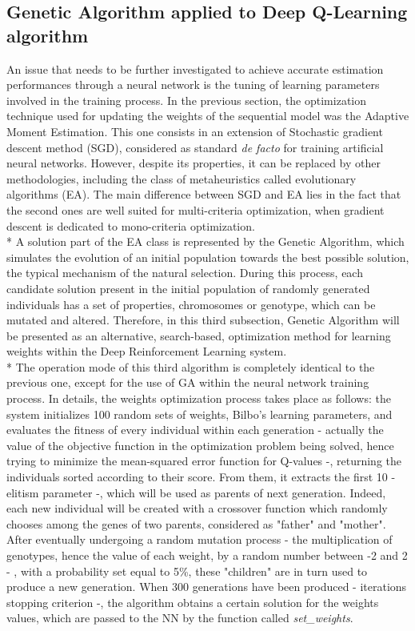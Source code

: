 \subsection{Genetic Algorithm applied to Deep Q-Learning algorithm}
An issue that needs to be further investigated to achieve accurate estimation performances through a neural network is the tuning of learning parameters involved in the training process. In the previous section, the optimization technique used for updating the weights of the sequential model was the Adaptive Moment Estimation. This one consists in an extension of Stochastic gradient descent method (SGD), considered as standard \textit{de facto} for training artificial neural networks. However, despite its properties, it can be replaced by other methodologies, including the class of metaheuristics called evolutionary algorithms (EA). The main difference between SGD and EA lies in the fact that the second ones are well suited for multi-criteria optimization, when gradient descent is dedicated to mono-criteria optimization.\\*
A solution part of the EA class is represented by the Genetic Algorithm, which simulates the evolution of an initial population towards the best possible solution, the typical mechanism of the natural selection. During this process, each candidate solution present in the initial population of randomly generated individuals has a set of properties, chromosomes or genotype, which can be mutated and altered. 
Therefore, in this third subsection, Genetic Algorithm will be presented as an alternative, search-based, optimization method for learning weights within the Deep Reinforcement Learning system.\\*
The operation mode of this third algorithm is completely identical to the previous one, except for the use of GA within the neural network training process. In details, the weights optimization process takes place as follows: the system initializes 100 random sets of weights, Bilbo's learning parameters, and evaluates the fitness of every individual within each generation - actually the value of the objective function in the optimization problem being solved, hence trying to minimize the mean-squared error function for Q-values -, returning the individuals sorted according to their score. From them, it extracts the first 10 - elitism parameter -, which will be used as parents of next generation. Indeed, each new individual will be created with a crossover function which randomly chooses among the genes of two parents, considered as "father" and "mother". After eventually undergoing a random mutation process - the multiplication of genotypes, hence the value of each weight, by a random number between -2 and 2 - , with a probability set equal to 5\%, these "children" are in turn used to produce a new generation. When 300 generations have been produced - iterations stopping criterion -, the algorithm obtains a certain solution for the weights values, which are passed to the NN by the function called \textit{set\_weights}. 

